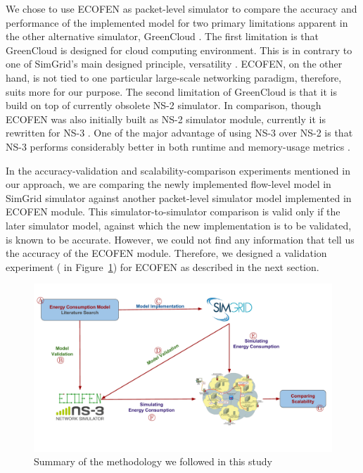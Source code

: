We chose to use ECOFEN as packet-level simulator to compare the accuracy and performance of the implemented model for two primary limitations apparent in the other alternative simulator, GreenCloud \cite{DBLP:journals/tjs/KliazovichBK12}. The first limitation is that GreenCloud is designed for cloud computing environment. This is in contrary to one of SimGrid's main designed principle, versatility \cite{DBLP:journals/jpdc/CasanovaGLQS14}. ECOFEN, on the other hand, is not tied to one particular large-scale networking paradigm, therefore, suits more for our purpose. The second limitation of GreenCloud is that it is build on top of currently obsolete NS-2 simulator. In comparison, though ECOFEN was also initially built as NS-2 simulator module, currently it is rewritten for NS-3 \cite{DBLP:conf/cloudnet/CorneaOL14}. One of the major advantage of using NS-3 over NS-2 is that NS-3 performs considerably better in both runtime and memory-usage metrics \cite{DBLP:conf/icc/WeingartnerLW09}.

In the accuracy-validation and scalability-comparison experiments mentioned in our approach, we are comparing the newly implemented flow-level model in SimGrid simulator against another packet-level simulator model implemented in ECOFEN module. This simulator-to-simulator comparison is valid only if the later simulator model, against which the new implementation is to be validated, is known to be accurate. However, we could not find any information that tell us the accuracy of the ECOFEN module. Therefore, we designed a validation experiment ( in Figure~\ref{fig:approach}) for ECOFEN as described in the next section. 

\begin{figure}[ht]
	\begin{center}
		\includegraphics[width=16cm]{images/approach.pdf}
		\caption{Summary of the methodology we followed in this study}
		\label{fig:approach}
	\end{center}
\end{figure}


